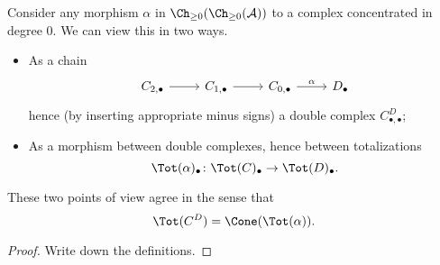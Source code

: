 \documentclass[main.tex]{subfiles}
\begin{document}
Consider any morphism $\alpha$ in $\Ch_{\geq 0}(\Ch_{\geq 0}(\mathcal{A}))$ to a complex concentrated in degree 0. We can view this in two ways.
\begin{itemize}
  \item As a chain
    \begin{equation*}
      \begin{tikzcd}
        C_{2,\bullet}
        \arrow[r]
        & C_{1,\bullet}
        \arrow[r]
        & C_{0,\bullet}
        \arrow[r, "\alpha"]
        & D_{\bullet}
      \end{tikzcd}
    \end{equation*}
    hence (by inserting appropriate minus signs) a double complex $C^{D}_{\bullet,\bullet}$;

  \item As a morphism between double complexes, hence between totalizations
    \begin{equation*}
      \Tot(\alpha)_{\bullet}\colon \Tot(C)_{\bullet} \to \Tot(D)_{\bullet}.
    \end{equation*}
\end{itemize}

\begin{lemma}
  \label{lemma:total_complex_is_cone_of_quasi_isomorphism}
  These two points of view agree in the sense that
  \begin{equation*}
    \Tot(C^{D}) = \Cone(\Tot(\alpha)).
  \end{equation*}
\end{lemma}
\begin{proof}
  Write down the definitions.
\end{proof}
\end{document}
